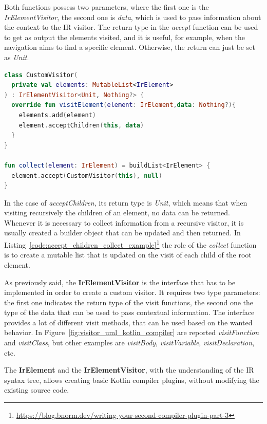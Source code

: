 Both functions possess two parameters, where the first one is the \textit{IrElementVisitor}, the second one is \textit{data}, which is used to pass information about the context to the IR visitor.\newline
The return type in the \textit{accept} function can be used to get as output the elements visited, and it is useful, for example, when the navigation aims to find a specific element. Otherwise, the return can just be set as \textit{Unit}.
\begin{lstlisting}[caption={Example of a custom visitor and a function that supports the collection of elements}, captionpos=b, language=Kotlin, label={code:accept_children_collect_example}]
class CustomVisitor(
  private val elements: MutableList<IrElement>
) : IrElementVisitor<Unit, Nothing?> {
  override fun visitElement(element: IrElement,data: Nothing?){
    elements.add(element)
    element.acceptChildren(this, data)
  }
}

fun collect(element: IrElement) = buildList<IrElement> {
  element.accept(CustomVisitor(this), null)
}
\end{lstlisting}
In the case of \textit{acceptChildren}, its return type is \textit{Unit}, which means that when visiting recursively the children of an element, no data can be returned. Whenever it is necessary to collect information from a recursive visitor, it is usually created a builder object that can be updated and then returned. In Listing~\ref{code:accept_children_collect_example}\footnote{\url{https://blog.bnorm.dev/writing-your-second-compiler-plugin-part-3}} the role of the \textit{collect} function is to create a mutable list that is updated on the visit of each child of the root element.

As previously said, the \textbf{IrElementVisitor} is the interface that has to be implemented in order to create a custom visitor. It requires two type parameters: the first one indicates the return type of the visit functions, the second one the type of the data that can be used to pass contextual information. The interface provides a lot of different visit methods, that can be used based on the wanted behavior. In Figure~\ref{fig:visitor_uml_kotlin_compiler} are reported \textit{visitFunction} and \textit{visitClass}, but other examples are \textit{visitBody}, \textit{visitVariable}, \textit{visitDeclaration}, etc.

The \textbf{IrElement} and the \textbf{IrElementVisitor}, with the understanding of the IR syntax tree, allows creating basic Kotlin compiler plugins, without modifying the existing source code.

